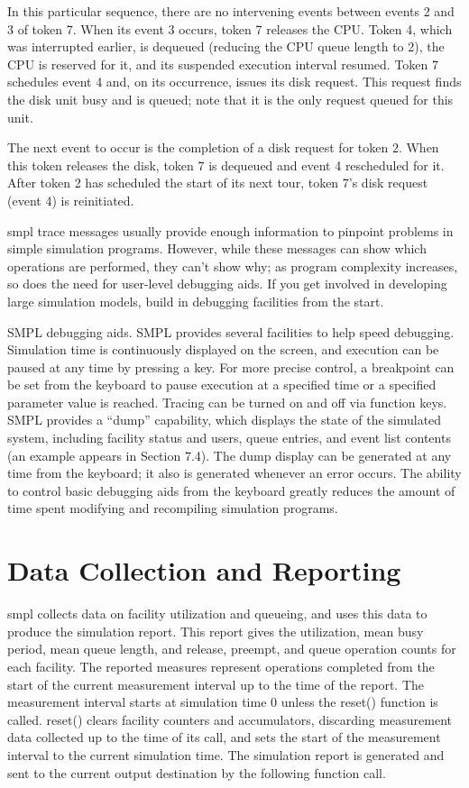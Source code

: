 In this particular sequence, there are no intervening events between events 2
and 3 of token 7. When its event 3 occurs, token 7 releases the CPU. Token 4,
which was interrupted earlier, is dequeued (reducing the CPU queue length to
2), the CPU is reserved for it, and its suspended execution interval resumed.
Token 7 schedules event 4 and, on its occurrence, issues its disk request. This
request finds the disk unit busy and is queued; note that it is the only
request queued for this unit.

The next event to occur is the completion of a disk request for token 2. When
this token releases the disk, token 7 is dequeued and event 4 rescheduled for
it. After token 2 has scheduled the start of its next tour, token 7's disk
request (event 4) is reinitiated.

smpl trace messages usually provide enough information to pinpoint problems in
simple simulation programs. However, while these messages can show which
operations are performed, they can't show why; as program complexity
increases, so does the need for user-level debugging aids. If you get involved
in developing large simulation models, build in debugging facilities from the
start.

SMPL debugging aids. SMPL provides several facilities to help speed debugging.
Simulation time is continuously displayed on the screen, and execution can be
paused at any time by pressing a key. For more precise control, a breakpoint
can be set from the keyboard to pause execution at a specified time or a
specified parameter value is reached. Tracing can be turned on and off via
function keys. SMPL provides a ``dump'' capability, which displays the state
of the simulated system, including facility status and users, queue entries,
and event list contents (an example appears in Section 7.4). The dump display
can be generated at any time from the keyboard; it also is generated whenever
an error occurs. The ability to control basic debugging aids from the keyboard
greatly reduces the amount of time spent modifying and recompiling simulation
programs.

\section{Data Collection and Reporting}
\label{sec:smpl-data-collection-reporting}

smpl collects data on facility utilization and queueing, and uses this data to
produce the simulation report. This report gives the utilization, mean busy
period, mean queue length, and release, preempt, and queue operation counts
for each facility. The reported measures represent operations completed from
the start of the current measurement interval up to the time of the report. The
measurement interval starts at simulation time 0 unless the reset() function
is called. reset() clears facility counters and accumulators, discarding
measurement data collected up to the time of its call, and sets the start of
the measurement interval to the current simulation time. The simulation report
is generated and sent to the current output destination by the following
function call.

